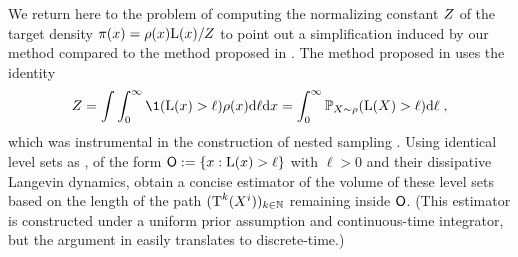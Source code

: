 \documentclass{article}
\begin{document}
We return here to the problem of computing the normalizing constant $Z$ of the target density $\pi(x) =\rho(x)\mathrm{L}(x)/Z$ to point out a simplification induced by our method compared to the method proposed in \cite{rotskoff:vanden-eijden:2019}.
The method proposed in \cite{rotskoff:vanden-eijden:2019} uses the identity
\begin{equation}\label{eq:nesting}    \const=\int \int_{0}^{\infty}\1(\likelihood(x)> \ell)\rho(x) \rmd \ell \rmd x =\int_0^\infty \mathbb{P}_{X\sim\rho}(\likelihood(X)> \ell) \rmd \ell\eqsp,
\end{equation}
which was instrumental in the construction of nested sampling
\cite{skilling2006nested,chopin:robert:2010}. Using identical level sets as \cite{skilling2006nested}, of the form $\mathsf{O}:=\{x:\mathrm{L}(x)>\ell\}$ with $\ell>0$ and their dissipative Langevin dynamics, \citep[Equation 13]{rotskoff:vanden-eijden:2019} obtain a concise estimator of the volume of these level sets based on the length of the path $(\operatorname{T}^k(X^i))_{k\in\mathbb N}$ remaining inside $\mathsf{O}$. (This estimator is constructed under a uniform prior assumption and continuous-time integrator, but the argument in \cite{rotskoff:vanden-eijden:2019} easily translates to discrete-time.)
\end{document}
